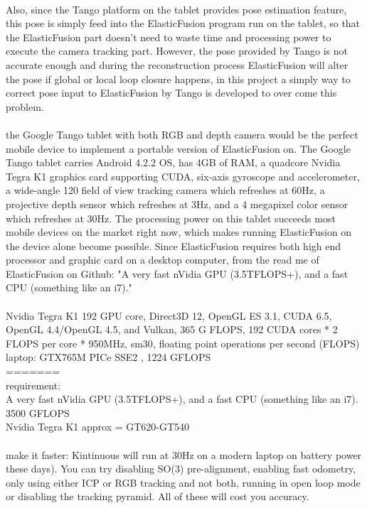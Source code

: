 \documentclass[12pt,twoside]{article}
\begin{document}
\\
Also, since the Tango platform on the tablet provides pose estimation feature, this pose is simply feed into the ElasticFusion program run on the tablet, so that the ElasticFusion part doesn't need to waste time and processing power to execute the camera tracking part. However, the pose provided by Tango is not accurate enough and during the reconstruction process ElasticFusion will alter the pose if global or local loop closure happens, in this project a simply way to correct pose input to ElasticFusion by Tango is developed to  over come this problem. \\
\\
the Google Tango tablet with both RGB and depth camera would be the perfect mobile device to implement a portable version of ElasticFusion on. The Google Tango tablet carries Android 4.2.2 OS, has 4GB of RAM, a quadcore Nvidia Tegra K1 graphics card supporting CUDA, six-axis gyroscope and accelerometer, a wide-angle 120 field of view tracking camera which refreshes at 60Hz, a projective depth sensor which refreshes at 3Hz, and a 4 megapixel color sensor which refreshes at 30Hz. The processing power on this tablet succeeds most mobile devices on the market right now, which makes running ElasticFusion on the device alone become possible. Since ElasticFusion requires both high end processor and graphic card on a desktop computer, from the read me of ElasticFusion on Github: "A very fast nVidia GPU (3.5TFLOPS+), and a fast CPU (something like an i7)."\\
\\
Nvidia Tegra K1  192  GPU core, Direct3D 12, OpenGL ES 3.1, CUDA 6.5, OpenGL 4.4/OpenGL 4.5, and Vulkan, 365 G FLOPS, 192 CUDA cores * 2 FLOPS per core * 950MHz, sm30, floating point operations per second (FLOPS)\\
laptop: GTX765M PICe SSE2 , 1224 GFLOPS\\

=======\\

requirement:\\
A very fast nVidia GPU (3.5TFLOPS+), and a fast CPU (something like an i7).  3500 GFLOPS\\
Nvidia Tegra K1  approx = GT620-GT540\\
\\
make it faster: Kintinuous will run at 30Hz on a modern laptop on battery power these days). You can try disabling SO(3) pre-alignment, enabling fast odometry, only using either ICP or RGB tracking and not both, running in open loop mode or disabling the tracking pyramid. All of these will cost you accuracy.\\
\end{document}
